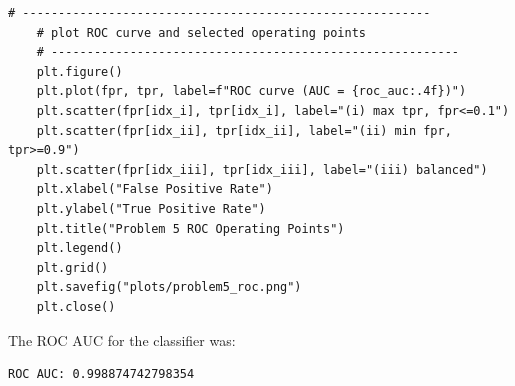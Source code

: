 \documentclass[11pt]{article}
\begin{document}
\begin{lstlisting}[style=matlabstyle]
	# ---------------------------------------------------------
	# plot ROC curve and selected operating points
	# ---------------------------------------------------------
	plt.figure()
	plt.plot(fpr, tpr, label=f"ROC curve (AUC = {roc_auc:.4f})")
	plt.scatter(fpr[idx_i], tpr[idx_i], label="(i) max tpr, fpr<=0.1")
	plt.scatter(fpr[idx_ii], tpr[idx_ii], label="(ii) min fpr, tpr>=0.9")
	plt.scatter(fpr[idx_iii], tpr[idx_iii], label="(iii) balanced")
	plt.xlabel("False Positive Rate")
	plt.ylabel("True Positive Rate")
	plt.title("Problem 5 ROC Operating Points")
	plt.legend()
	plt.grid()
	plt.savefig("plots/problem5_roc.png")
	plt.close()
	\end{lstlisting}
	
	The ROC AUC for the classifier was:
	
	\begin{lstlisting}[style=matlabstyle]
		ROC AUC: 0.998874742798354
	\end{lstlisting}
	
\end{document}
